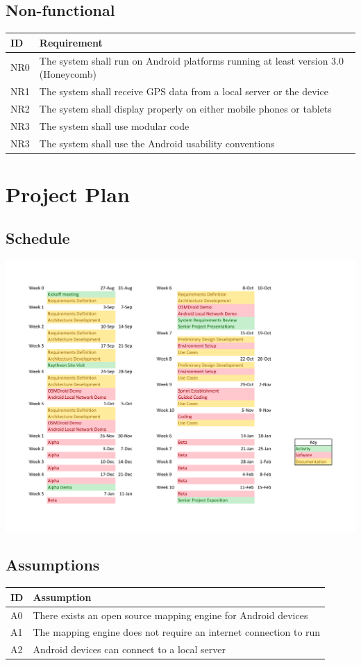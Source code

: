 \documentclass{article}
\begin{document}
\subsection{Non-functional}

\begin{tabular}{ | p{.5in} | p{5in} | }
\hline
\textbf{ID} & \textbf{Requirement}\\
\hline
\hline
NR0 & The system shall run on Android platforms running at least version 3.0 (Honeycomb)\\
\hline
NR1 & The system shall receive GPS data from a local server or the device\\
\hline
NR2 & The system shall display properly on either mobile phones or tablets\\
\hline
NR3 & The system shall use modular code\\
\hline
NR3 & The system shall use the Android usability conventions\\
\hline
\end{tabular}

\section{Project Plan}
\subsection{Schedule}
\includegraphics[keepaspectratio, width=8in]{Schedule/FallSchedule.pdf} \\

\subsection{Assumptions}
\begin{tabular}{ | p{.5in} | p{4.5in} | }
\hline
\textbf{ID} & \textbf{Assumption}\\
\hline
\hline
A0 & There exists an open source mapping engine for Android devices\\
\hline
A1 & The mapping engine does not require an internet connection to run\\
\hline
A2 & Android devices can connect to a local server\\
\hline
\end{tabular}
\end{document}
